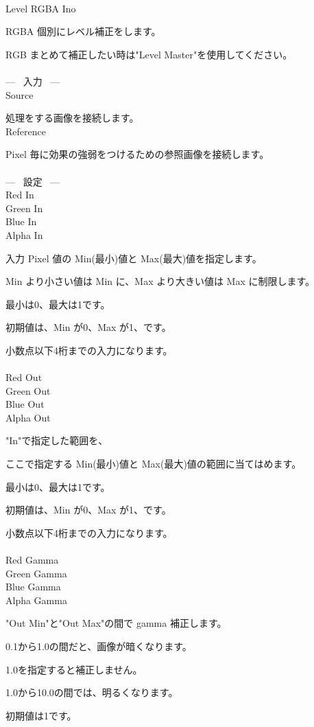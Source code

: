 \documentclass[a4paper,12pt]{article}
\begin{document}
\thispagestyle{empty}

\Large
\noindent \\
Level RGBA Ino\medskip
\par
\normalsize
RGBA 個別にレベル補正をします。\par
RGB まとめて補正したい時は"Level Master"を使用してください。\\
\\
--- \ 入力 \ ---\\
Source\par
処理をする画像を接続します。\\
Reference\par
Pixel 毎に効果の強弱をつけるための参照画像を接続します。\\
\\
--- \ 設定 \ ---\\
Red In\\
Green In\\
Blue In\\
Alpha In\par
入力 Pixel 値の Min(最小)値と Max(最大)値を指定します。\par
Min より小さい値は Min に、Max より大きい値は Max に制限します。\par
最小は0、最大は1です。\par
初期値は、Min が0、Max が1、です。\par
小数点以下4桁までの入力になります。\\
\\
Red Out\\
Green Out\\
Blue Out\\
Alpha Out\par
"In"で指定した範囲を、\par
ここで指定する Min(最小)値と Max(最大)値の範囲に当てはめます。\par
最小は0、最大は1です。\par
初期値は、Min が0、Max が1、です。\par
小数点以下4桁までの入力になります。\\
\\
Red Gamma\\
Green Gamma\\
Blue Gamma\\
Alpha Gamma\par
"Out Min"と"Out Max"の間で gamma 補正します。\par
0.1から1.0の間だと、画像が暗くなります。\par
1.0を指定すると補正しません。\par
1.0から10.0の間では、明るくなります。\par
初期値は1です。
\end{document}

